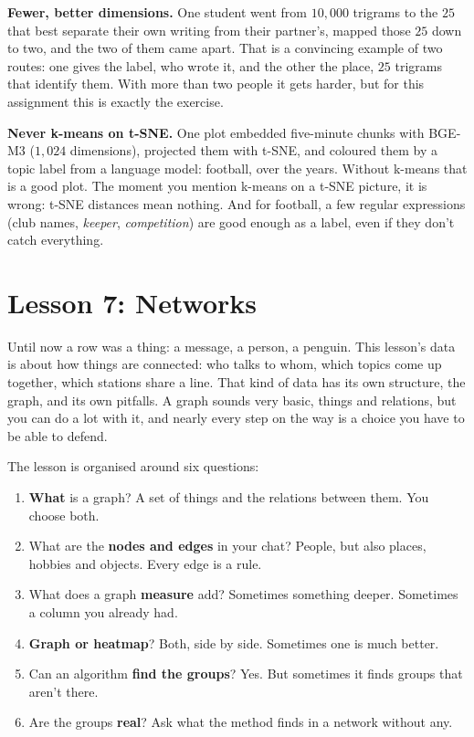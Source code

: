 \documentclass[12pt, a4paper]{article}
\theoremstyle{definition}
\theoremstyle{remark}
\begin{document}
\textbf{Fewer, better dimensions.} One student went from $10{,}000$ trigrams to the $25$ that best separate their own writing from their partner's, mapped those $25$ down to two, and the two of them came apart. That is a convincing example of two routes: one gives the label, who wrote it, and the other the place, $25$ trigrams that identify them. With more than two people it gets harder, but for this assignment this is exactly the exercise.

\textbf{Never k-means on t-SNE.} One plot embedded five-minute chunks with BGE-M3 ($1{,}024$ dimensions), projected them with t-SNE, and coloured them by a topic label from a language model: football, over the years. Without k-means that is a good plot. The moment you mention k-means on a t-SNE picture, it is wrong: t-SNE distances mean nothing. And for football, a few regular expressions (club names, \emph{keeper}, \emph{competition}) are good enough as a label, even if they don't catch everything.
\newpage

\section{Lesson 7: Networks}
\label{sec:lesson7}
Until now a row was a thing: a message, a person, a penguin. This lesson's data is about how things are connected: who talks to whom, which topics come up together, which stations share a line. That kind of data has its own structure, the graph, and its own pitfalls. A graph sounds very basic, things and relations, but you can do a lot with it, and nearly every step on the way is a choice you have to be able to defend.

The lesson is organised around six questions:

\begin{enumerate}
\item \textbf{What} is a graph? A set of things and the relations between them. You choose both.
\item What are the \textbf{nodes and edges} in your chat? People, but also places, hobbies and objects. Every edge is a rule.
\item What does a graph \textbf{measure} add? Sometimes something deeper. Sometimes a column you already had.
\item \textbf{Graph or heatmap}? Both, side by side. Sometimes one is much better.
\item Can an algorithm \textbf{find the groups}? Yes. But sometimes it finds groups that aren't there.
\item Are the groups \textbf{real}? Ask what the method finds in a network without any.
\end{enumerate}
\end{document}
